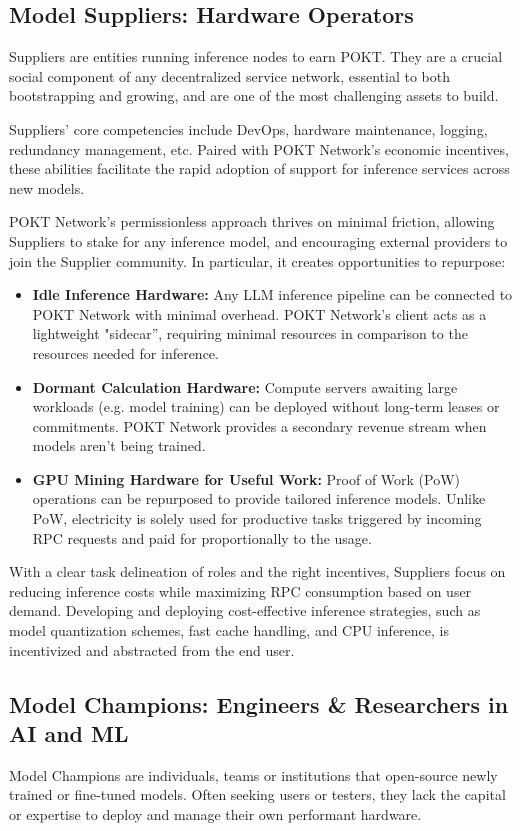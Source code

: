 \documentclass[conference,compsoc]{IEEEtran}
\begin{document}
\subsection{Model Suppliers: Hardware Operators}

Suppliers are entities running inference nodes to earn POKT. They are a crucial social component of any decentralized service network, essential to both bootstrapping and growing, and are one of the most challenging assets to build.

Suppliers' core competencies include DevOps, hardware maintenance, logging, redundancy management, etc. Paired with POKT Network’s economic incentives, these abilities facilitate the rapid adoption of support for inference services across new models.

POKT Network's permissionless approach thrives on minimal friction, allowing Suppliers to stake for any inference model, and encouraging external providers to join the Supplier community. In particular, it creates opportunities to repurpose:

\begin{itemize}
    \item \textbf{Idle Inference Hardware:} Any LLM inference pipeline can be connected to POKT Network with minimal overhead. POKT Network's client acts as a lightweight "sidecar”, requiring minimal resources in comparison to the resources needed for inference.
    \item \textbf{Dormant Calculation Hardware:} Compute servers awaiting large workloads (e.g. model training) can be deployed without long-term leases or commitments. POKT Network provides a secondary revenue stream when models aren't being trained.
    \item \textbf{GPU Mining Hardware for Useful Work:} Proof of Work (PoW) operations can be repurposed to provide tailored inference models. Unlike PoW, electricity is solely used for productive tasks triggered by incoming RPC requests and paid for proportionally to the usage.
\end{itemize}

With a clear task delineation of roles and the right incentives, Suppliers focus on reducing inference costs while maximizing RPC consumption based on user demand. Developing and deploying cost-effective inference strategies, such as model quantization schemes, fast cache handling, and CPU inference, is incentivized and abstracted from the end user.


\subsection{Model Champions: Engineers \& Researchers in AI and ML}
Model Champions are individuals, teams or institutions that open-source newly trained or fine-tuned models. Often seeking users or testers, they lack the capital or expertise to deploy and manage their own performant hardware.
\end{document}
